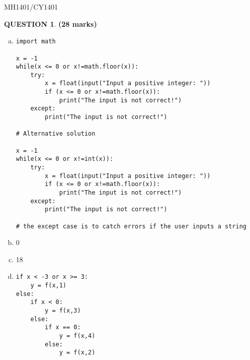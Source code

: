 \documentclass[a4paper,12pt]{article}
\theoremstyle{definition}
\newtheorem{ques}[dummy]{QUESTION}
\theoremstyle{plain}
\newcommand{\py}{python}
\begin{document}
	\newpage
\hfill MH1401/CY1401\vspace*{0.5em}\
\begin{ques}\hfill\textbf{(28 marks)}\\
	\begin{enumerate}[(a)]
		\item 
		\begin{verbatim}
import math

x = -1
while(x <= 0 or x!=math.floor(x)):
    try:
        x = float(input("Input a positive integer: "))
        if (x <= 0 or x!=math.floor(x)):
            print("The input is not correct!")
    except:
        print("The input is not correct!")

# Alternative solution

x = -1
while(x <= 0 or x!=int(x)):
    try:
        x = float(input("Input a positive integer: "))
        if (x <= 0 or x!=math.floor(x)):
            print("The input is not correct!")
    except:
        print("The input is not correct!")
        
# the except case is to catch errors if the user inputs a string
		\end{verbatim}
		\item 0
		\item 18
		\item 
\begin{verbatim}
if x < -3 or x >= 3:
    y = f(x,1)
else:
    if x < 0:
        y = f(x,3)
    else:
        if x == 0:
            y = f(x,4)
        else:
            y = f(x,2)
\end{verbatim}
	\end{enumerate}
\end{ques}
\end{document}
